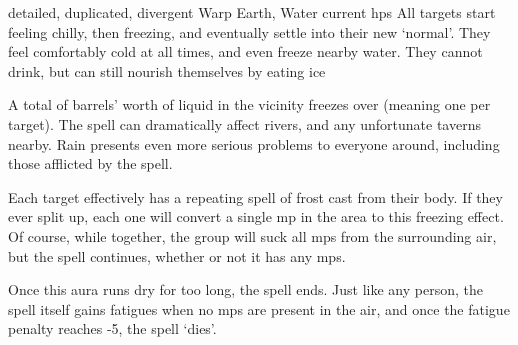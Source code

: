   {detailed, duplicated, divergent}%
  {Warp}%
  {Earth, Water}%
  {current \glspl{hp}}%
  {All  targets start feeling chilly, then freezing, and eventually settle into their new `normal'.
    They feel comfortably cold at all times, and even freeze nearby water.
    They cannot drink, but can still nourish themselves by eating ice}%
  {A total of  barrels' worth of liquid in the vicinity freezes over (meaning one per target).
    The spell can dramatically affect rivers, and any unfortunate taverns nearby.
    Rain presents even more serious problems to everyone around, including those afflicted by the spell.

    Each target effectively has a repeating spell of frost cast from their body.
    If they ever split up, each one will convert a single \gls{mp} in the area to this freezing effect.
    Of course, while together, the group will suck all \glspl{mp} from the surrounding air, but the spell continues, whether or not it has any \glspl{mp}.

    Once this aura runs dry for too long, the spell ends.
    Just like any person, the spell itself gains \glspl{fatigue} when no \glspl{mp} are present in the air, and once the \gls{fatigue} penalty reaches -5, the spell `dies'.
  }

